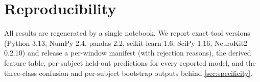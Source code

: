 \documentclass[conference]{IEEEtran}
\begin{document}
\section*{Reproducibility}
All results are regenerated by a single notebook. We report exact tool versions
(Python 3.13, NumPy 2.4, pandas 2.2, scikit-learn 1.6, SciPy 1.16, NeuroKit2 0.2.10)
and release a per-window manifest (with rejection reasons), the derived feature table,
per-subject held-out predictions for every reported model, and the three-class confusion
and per-subject bootstrap outputs behind \cref{sec:specificity}.

{\small


}
\end{document}
